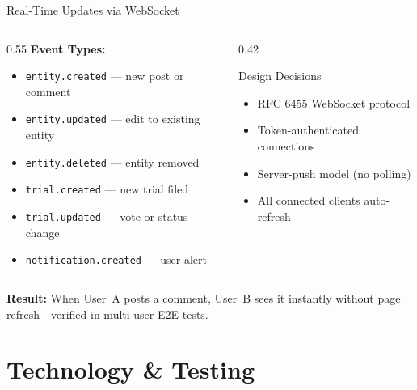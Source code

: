 \documentclass[aspectratio=169,11pt]{beamer}
\begin{document}
\begin{frame}{Real-Time Updates via WebSocket}
  \begin{columns}[T]
    \begin{column}{0.55\textwidth}
      \textbf{Event Types:}
      \begin{itemize}
        \item \texttt{entity.created} --- new post or comment
        \item \texttt{entity.updated} --- edit to existing entity
        \item \texttt{entity.deleted} --- entity removed
        \item \texttt{trial.created} --- new trial filed
        \item \texttt{trial.updated} --- vote or status change
        \item \texttt{notification.created} --- user alert
      \end{itemize}
    \end{column}
    \begin{column}{0.42\textwidth}
      \begin{block}{Design Decisions}
        \begin{itemize}
          \item RFC 6455 WebSocket protocol
          \item Token-authenticated connections
          \item Server-push model (no polling)
          \item All connected clients auto-refresh
        \end{itemize}
      \end{block}
    \end{column}
  \end{columns}
  \vspace{0.5em}
  \textbf{Result:} When User~A posts a comment, User~B sees it
  instantly without page refresh---verified in multi-user E2E tests.
\end{frame}

\section{Technology \& Testing}
\end{document}
